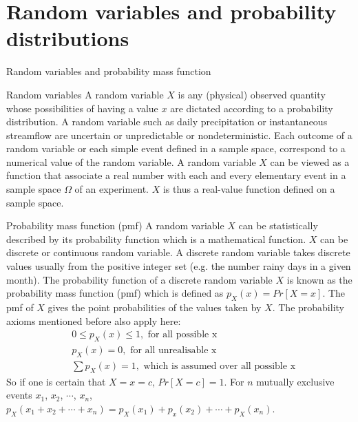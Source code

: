 \documentclass[8pt]{beamer}
\renewcommand{\emph}[1]{\textcolor{myorange}{#1}}
\begin{document}
\section{Random variables and probability distributions}
\begin{frame}{Random variables and probability mass function}
    \begin{block}{Random variables}
        A \emph{random variable} $X$ is any (physical) observed quantity whose possibilities of having a value $x$ are dictated according to a probability distribution. A random variable such as daily precipitation or instantaneous streamflow are \emph{uncertain} or \emph{unpredictable} or \emph{nondeterministic}. Each outcome of a random variable or each simple event defined in a sample space, correspond to a numerical value of the random variable. A random variable $X$ can be viewed as a function that associate a real number with each and every elementary event in a sample space $\Omega$ of an experiment. $X$ is thus a real-value function defined on a sample space.  
    \end{block}
    
        \vspace{-3pt}
    \begin{block}{Probability mass function (pmf)}
        A random variable $X$ can be statistically described by its probability function which is a mathematical function. $X$ can be discrete or continuous random variable. A discrete random variable takes discrete values usually from the positive integer set (e.g. the number rainy days in a given month). The probability function of a discrete random variable $X$ is known as the \emph{probability mass function (pmf)} which is defined as $p_X (x) = Pr[X = x]$. The pmf of $X$ gives the point probabilities of the values taken by $X$. The probability axioms mentioned before also apply here:
        \vspace{-6pt}
        \begin{align*}
            & 0 \leq p_X (x) \leq 1, \text{   for all possible x}\\
            & p_X (x) = 0, \text{   for all unrealisable x} \\
            & \sum p_X (x) = 1, \text{   which is assumed over all possible x}
        \end{align*}
    So if one is certain that $X = x = c$, $Pr[X = c] = 1$. For $n$ mutually exclusive events $x_1$, $x_2$, $\cdots$, $x_n$, $p_X (x_1 + x_2 + \cdots + x_n) = p_X (x_1) + p_x(x_2) + \cdots + p_X (x_n)$.
    \end{block}
\end{frame}
\end{document}
